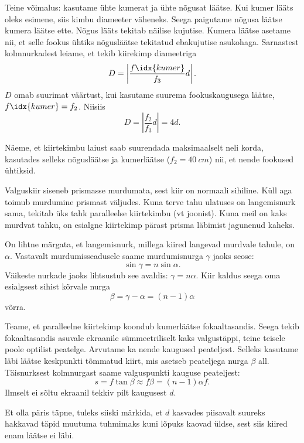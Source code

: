 \documentclass[10pt]{article}
\begin{document}
{Teine võimalus: kasutame ühte kumerat ja ühte nõgusat läätse. Kui kumer lääts oleks esimene, siis kimbu diameeter väheneks. Seega paigutame nõgusa läätse kumera läätse ette. Nõgus lääts tekitab näilise kujutise. Kumera läätse asetame nii, et selle fookus ühtiks nõgusläätse tekitatud ebakujutise asukohaga. Sarnastest kolmnurkadest leiame, et tekib kiirekimp diameetriga
\[
D = \left|\frac{f\idx{kumer}}{f_3}d\right|.
\]
$D$ omab suurimat väärtust, kui kasutame suurema fookuskaugusega läätse, $f\idx{kumer} = f_2$. Niisiis
\[
D = \left|\frac{f_2}{f_3}d\right| = 4d.
\]


Näeme, et kiirtekimbu laiust saab suurendada maksimaalselt neli korda, kasutades selleks nõgusläätse ja kumerläätse ($f_2 = \SI{40}{cm}$) nii, et nende fookused ühtiksid.
\probend
\bigskip


\solu
Valguskiir siseneb prismasse murdumata, sest kiir on normaali sihiline. Küll aga toimub murdumine prismast väljudes. Kuna terve tahu ulatuses on langemisnurk sama, tekitab üks tahk paralleelse kiirtekimbu (vt joonist). Kuna meil on kaks murdvat tahku, on esialgne kiirtekimp pärast prisma läbimist jagunenud kaheks.

On lihtne märgata, et langemisnurk, millega kiired langevad murdvale tahule, on $\alpha$. 
Vastavalt murdumisseadusele saame murdumisnurga $\gamma$ jaoks seose:
\[
\sin \gamma = n \sin \alpha.
\]
Väikeste nurkade jaoks lihtsustub see avaldis: $\gamma = n\alpha$. Kiir kaldus seega oma esialgsest sihist kõrvale nurga
\[
\beta = \gamma - \alpha = (n - 1) \alpha
\]
võrra. 

Teame, et paralleelne kiirtekimp koondub kumerläätse fokaaltasandis. Seega tekib fokaaltasandis asuvale ekraanile sümmeetriliselt kaks valgustäppi, teine teisele poole optilist peatelge. Arvutame ka nende kaugused peateljest. Selleks kasutame läbi läätse keskpunkti tõmmatud kiirt, mis asetseb peateljega nurga $\beta$ all. Täisnurksest kolmnurgast saame valguspunkti kauguse peateljest:
\[
s = f \tan \beta \approx f \beta = (n - 1)\alpha f.
\]
Ilmselt ei sõltu ekraanil tekkiv pilt kaugusest $d$.

Et olla päris täpne, tuleks siiski märkida, et $d$ kasvades piisavalt suureks hakkavad täpid muutuma tuhmimaks kuni lõpuks kaovad üldse, sest siis kiired enam läätse ei läbi.

}
\end{document}
